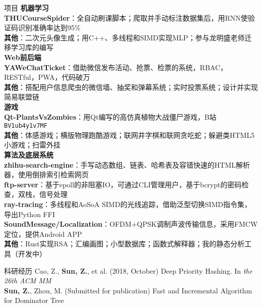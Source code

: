 \documentclass{resume}
\begin{document}
\begin{rSection}{项目}
\hspace*{-0.2in}\textbf{机器学习} \\
\textbf{THUCourseSpider}：全自动刷课脚本；爬取并手动标注数据集后，用RNN使验证码识别准确率达到95\% \\
\textbf{其他}：二次元头像生成；用C++、多线程和SIMD实现MLP；参与龙明盛老师迁移学习库的编写 \\
\hspace*{-0.2in}\textbf{Web前后端} \\
\textbf{YAWeChatTicket}：借助微信发布活动、抢票、检票的系统，RBAC，RESTful，PWA，代码破万 \\
\textbf{其他}：搭配用户信息爬虫的微信墙、抽奖和弹幕系统；实时投票系统；设计并实现简易联盟链 \\
\hspace*{-0.2in}\textbf{游戏} \\
\textbf{Qt-PlantsVsZombies}：用Qt编写的高仿真植物大战僵尸游戏，B站\texttt{BV1ub4y1v7MF} \\
\textbf{其他}：体感游戏；横版物理跑酷游戏；联网井字棋和联网贪吃蛇；躲避类HTML5小游戏；扫雷外挂 \\
\hspace*{-0.2in}\textbf{算法及底层系统} \\
\textbf{zhihu-search-engine}：手写动态数组、链表、哈希表及容错快速的HTML解析器，使用倒排索引检索网页 \\
\textbf{ftp-server}：基于epoll的非阻塞IO，可通过CLI管理用户，基于bcrypt的密码检查，双栈，信号处理 \\
\textbf{ray-tracing}：多线程和AoSoA SIMD的光线追踪，借助泛型切换SIMD指令集，导出Python FFI \\
\textbf{SoundMessage/Localization}：OFDM+QPSK调制声波传输信息，采用FMCW定位，提供Android APP \\
\textbf{其他}：Rust实现RSA；汇编画图；小型数据库；函数式解释器；我的静态分析工具（开发中）
\end{rSection}

\begin{rSection}{科研经历}
Cao, Z., \textbf{Sun, Z.}, et al. (2018, October) Deep Priority Hashing. In \textit{the 26th ACM MM} \\
\textbf{Sun, Z.}, Zhou, M. (Submitted for publication) Fast and Incremental Algorithm for Dominator Tree
\end{rSection}
\end{document}
